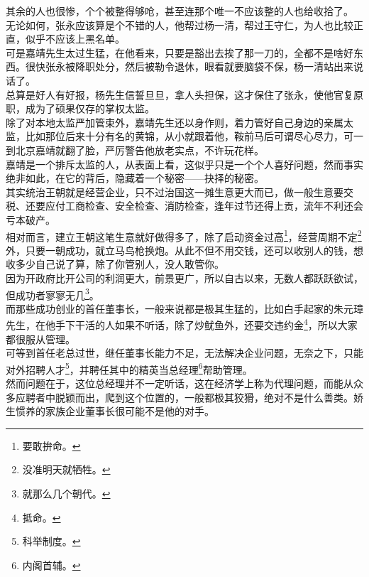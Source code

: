 \begin{multicols}{\theparacolNo}
其余的人也很惨，个个被整得够呛，甚至连那个唯一不应该整的人也给收拾了。\\

无论如何，张永应该算是个不错的人，他帮过杨一清，帮过王守仁，为人也比较正直，似乎不应该上黑名单。\\

可是嘉靖先生太过生猛，在他看来，只要是豁出去挨了那一刀的，全都不是啥好东西。很快张永被降职处分，然后被勒令退休，眼看就要脑袋不保，杨一清站出来说话了。\\

总算是好人有好报，杨先生信誓旦旦，拿人头担保，这才保住了张永，使他官复原职，成为了硕果仅存的掌权太监。\\

除了对本地太监严加管束外，嘉靖先生还以身作则，着力管好自己身边的亲属太监，比如那位后来十分有名的黄锦，从小就跟着他，鞍前马后可谓尽心尽力，可一到北京嘉靖就翻了脸，严厉警告他放老实点，不许玩花样。\\

嘉靖是一个排斥太监的人，从表面上看，这似乎只是一个个人喜好问题，然而事实绝非如此，在它的背后，隐藏着一个秘密——抉择的秘密。\\

其实统治王朝就是经营企业，只不过治国这一摊生意更大而已，做一般生意要交税、还要应付工商检查、安全检查、消防检查，逢年过节还得上贡，流年不利还会亏本破产。\\

相对而言，建立王朝这笔生意就好做得多了，除了启动资金过高\footnote{要敢拚命。}，经营周期不定\footnote{没准明天就牺牲。}外，只要一朝成功，就立马鸟枪换炮。从此不但不用交钱，还可以收别人的钱，想收多少自己说了算，除了你管别人，没人敢管你。\\

因为开政府比开公司的利润更大，前景更广，所以自古以来，无数人都跃跃欲试，但成功者寥寥无几\footnote{就那么几个朝代。}。\\

而那些成功创业的首任董事长，一般来说都是极其生猛的，比如白手起家的朱元璋先生，在他手下干活的人如果不听话，除了炒鱿鱼外，还要交违约金\footnote{抵命。}，所以大家都很服从管理。\\

可等到首任老总过世，继任董事长能力不足，无法解决企业问题，无奈之下，只能对外招聘人才\footnote{科举制度。}，并聘任其中的精英当总经理\footnote{内阁首辅。}帮助管理。\\

然而问题在于，这位总经理并不一定听话，这在经济学上称为代理问题，而能从众多应聘者中脱颖而出，爬到这个位置的，一般都极其狡猾，绝对不是什么善类。娇生惯养的家族企业董事长很可能不是他的对手。\\


\end{multicols}
